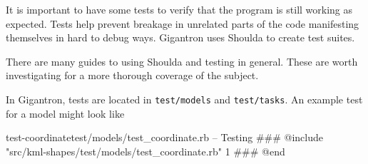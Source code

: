 \documentclass[12pt]{article}
\begin{document}
It is important to have some tests to verify that the program is still working as expected.  Tests help prevent breakage in unrelated parts of the code manifesting themselves in hard to debug ways.  Gigantron uses Shoulda to create test suites.  

There are many guides to using Shoulda and testing in general.  These are worth investigating for a more thorough coverage of the subject.

In Gigantron, tests are located in \texttt{test/models} and \texttt{test/tasks}.  An example test for a model might look like

\pagebreak

\begin{code}{test-coordinate}{test/models/test\_coordinate.rb -- Testing}
### @include "src/kml-shapes/test/models/test_coordinate.rb" 1
### @end
\end{code}


\end{document}
